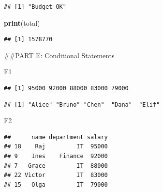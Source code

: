 \documentclass[
]{article}
\newenvironment{Shaded}{\begin{snugshade}}{\end{snugshade}}
\newcommand{\AttributeTok}[1]{\textcolor[rgb]{0.13,0.29,0.53}{#1}}
\newcommand{\ConstantTok}[1]{\textcolor[rgb]{0.56,0.35,0.01}{#1}}
\newcommand{\DecValTok}[1]{\textcolor[rgb]{0.00,0.00,0.81}{#1}}
\newcommand{\FunctionTok}[1]{\textcolor[rgb]{0.13,0.29,0.53}{\textbf{#1}}}
\newcommand{\NormalTok}[1]{#1}
\newcommand{\OtherTok}[1]{\textcolor[rgb]{0.56,0.35,0.01}{#1}}
\newcommand{\SpecialCharTok}[1]{\textcolor[rgb]{0.81,0.36,0.00}{\textbf{#1}}}
\newcommand{\StringTok}[1]{\textcolor[rgb]{0.31,0.60,0.02}{#1}}
\begin{document}
\begin{verbatim}
## [1] "Budget OK"
\end{verbatim}

\begin{Shaded}
\begin{Highlighting}[]
\FunctionTok{print}\NormalTok{(total)}
\end{Highlighting}
\end{Shaded}

\begin{verbatim}
## [1] 1578770
\end{verbatim}

\#\#PART E: Conditional Statements

F1

\begin{Shaded}
\end{Shaded}

\begin{verbatim}
## [1] 95000 92000 88000 83000 79000
\end{verbatim}

\begin{Shaded}
\end{Shaded}

\begin{verbatim}
## [1] "Alice" "Bruno" "Chen"  "Dana"  "Elif"
\end{verbatim}

F2

\begin{Shaded}
\end{Shaded}

\begin{verbatim}
##      name department salary
## 18    Raj         IT  95000
## 9    Ines    Finance  92000
## 7   Grace         IT  88000
## 22 Victor         IT  83000
## 15   Olga         IT  79000
\end{verbatim}
\end{document}
